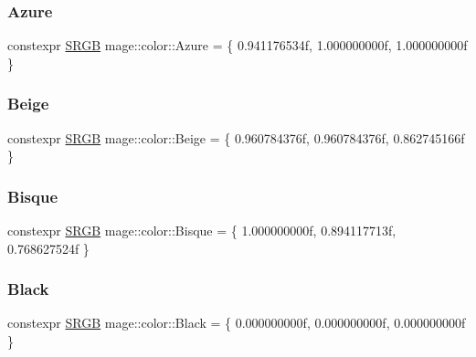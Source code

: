 \subsubsection{\texorpdfstring{Azure}{Azure}}
{\footnotesize\ttfamily constexpr \hyperlink{structmage_1_1_s_r_g_b}{S\+R\+GB} mage\+::color\+::\+Azure = \{ 0.\+941176534f, 1.\+000000000f, 1.\+000000000f \}}

\hypertarget{namespacemage_1_1color_a29724d7a84563696c81bde80965df6e9}{}\label{namespacemage_1_1color_a29724d7a84563696c81bde80965df6e9} 
\subsubsection{\texorpdfstring{Beige}{Beige}}
{\footnotesize\ttfamily constexpr \hyperlink{structmage_1_1_s_r_g_b}{S\+R\+GB} mage\+::color\+::\+Beige = \{ 0.\+960784376f, 0.\+960784376f, 0.\+862745166f \}}

\hypertarget{namespacemage_1_1color_acfb911e20ac2103496ab025ca652561a}{}\label{namespacemage_1_1color_acfb911e20ac2103496ab025ca652561a} 
\subsubsection{\texorpdfstring{Bisque}{Bisque}}
{\footnotesize\ttfamily constexpr \hyperlink{structmage_1_1_s_r_g_b}{S\+R\+GB} mage\+::color\+::\+Bisque = \{ 1.\+000000000f, 0.\+894117713f, 0.\+768627524f \}}

\hypertarget{namespacemage_1_1color_a67092a9054996e6e8b74e5b0214d65b1}{}\label{namespacemage_1_1color_a67092a9054996e6e8b74e5b0214d65b1} 
\subsubsection{\texorpdfstring{Black}{Black}}
{\footnotesize\ttfamily constexpr \hyperlink{structmage_1_1_s_r_g_b}{S\+R\+GB} mage\+::color\+::\+Black = \{ 0.\+000000000f, 0.\+000000000f, 0.\+000000000f \}}

\hypertarget{namespacemage_1_1color_ab6df452be70120176935fa2355f8ac28}{}\label{namespacemage_1_1color_ab6df452be70120176935fa2355f8ac28} 
